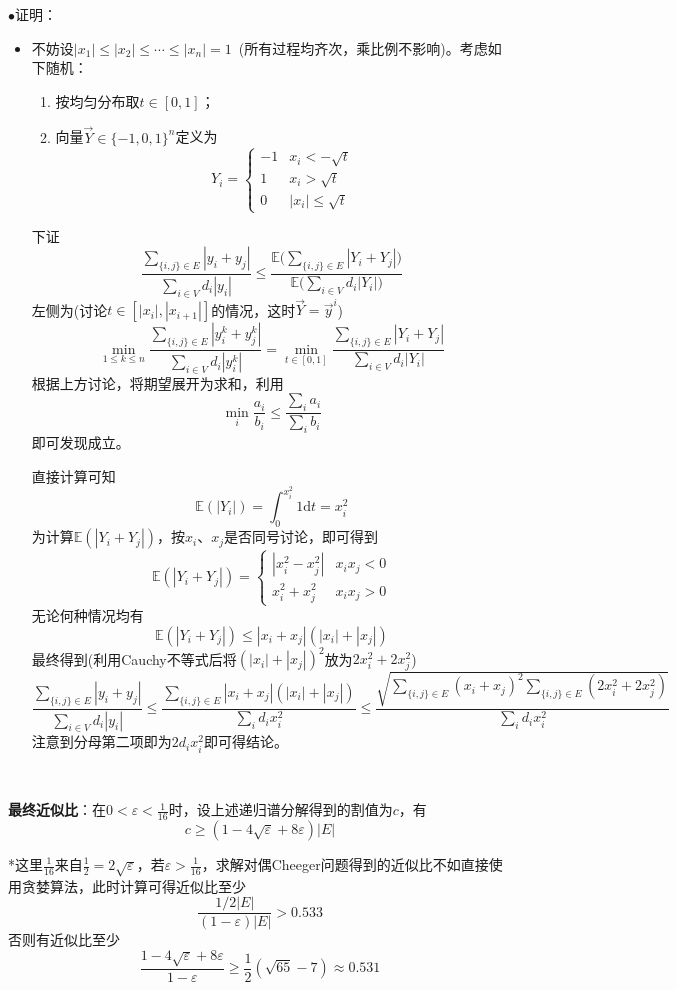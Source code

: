 \documentclass[a4paper,UTF8,fontset=windows]{ctexart}
\newcommand{\proo}[1]{{\kaishu $\bullet$证明：
\begin{itemize}
    \item[] #1
\end{itemize}
}}
\begin{document}
\proo{
    不妨设$|x_1|\le|x_2|\le\cdots\le|x_n|=1$\ (所有过程均齐次，乘比例不影响)。考虑如下随机：
    \begin{enumerate}
        \item 按均匀分布取$t\in[0,1]$；
        \item 向量$\vec{Y}\in\{-1,0,1\}^n$定义为
        $$Y_i=\begin{cases}-1&x_i<-\sqrt{t}\\1&x_i>\sqrt{t}\\0&|x_i|\le\sqrt{t}\end{cases}$$
    \end{enumerate}
    下证
    $$\frac{\sum_{\{i,j\}\in E}|y_i+y_j|}{\sum_{i\in V}d_i|y_i|}\le\frac{\mathbb{E}\big(\sum_{\{i,j\}\in E}|Y_i+Y_j|\big)}{\mathbb{E}\big(\sum_{i\in V}d_i|Y_i|\big)}$$
    左侧为(讨论$t\in[|x_i|,|x_{i+1}|]$的情况，这时$\vec{Y}=\vec{y}^i$)
    $$\min_{1\le k\le n}\frac{\sum_{\{i,j\}\in E}|y_i^k+y_j^k|}{\sum_{i\in V}d_i|y_i^k|}=\min_{t\in[0,1]}\frac{\sum_{\{i,j\}\in E}|Y_i+Y_j|}{\sum_{i\in V}d_i|Y_i|}$$
    根据上方讨论，将期望展开为求和，利用
    $$\min_i\frac{a_i}{b_i}\le\frac{\sum_ia_i}{\sum_ib_i}$$
    即可发现成立。

    直接计算可知
    $$\mathbb{E}(|Y_i|)=\int_0^{x_i^2}1\mathrm{d}t=x_i^2$$
    为计算$\mathbb{E}(|Y_i+Y_j|)$，按$x_i$、$x_j$是否同号讨论，即可得到
    $$\mathbb{E}(|Y_i+Y_j|)=\begin{cases}|x_i^2-x_j^2|&x_ix_j<0\\x_i^2+x_j^2&x_ix_j>0\end{cases}$$
    无论何种情况均有
    $$\mathbb{E}(|Y_i+Y_j|)\le|x_i+x_j|(|x_i|+|x_j|)$$
    最终得到(利用Cauchy不等式后将$(|x_i|+|x_j|)^2$放为$2x_i^2+2x_j^2$)
    $$\frac{\sum_{\{i,j\}\in E}|y_i+y_j|}{\sum_{i\in V}d_i|y_i|}\le\frac{\sum_{\{i,j\}\in E}|x_i+x_j|(|x_i|+|x_j|)}{\sum_id_ix_i^2}\le\frac{\sqrt{\sum_{\{i,j\}\in E}(x_i+x_j)^2\sum_{\{i,j\}\in E}(2x_i^2+2x_j^2)}}{\sum_id_ix_i^2}$$
    注意到分母第二项即为$2d_ix_i^2$即可得结论。
}

\

\textbf{最终近似比}：在$0<\varepsilon<\frac{1}{16}$时，设上述递归谱分解得到的割值为$c$，有
$$c\ge(1-4\sqrt\varepsilon+8\varepsilon)|E|$$

*这里$\frac{1}{16}$来自$\frac{1}{2}=2\sqrt\varepsilon$，若$\varepsilon>\frac{1}{16}$，求解对偶Cheeger问题得到的近似比不如直接使用贪婪算法，此时计算可得近似比至少
$$\frac{1/2|E|}{(1-\varepsilon)|E|}>0.533$$
否则有近似比至少
$$\frac{1-4\sqrt\varepsilon+8\varepsilon}{1-\varepsilon}\ge\frac{1}{2}(\sqrt{65}-7)\approx0.531$$
\end{document}
